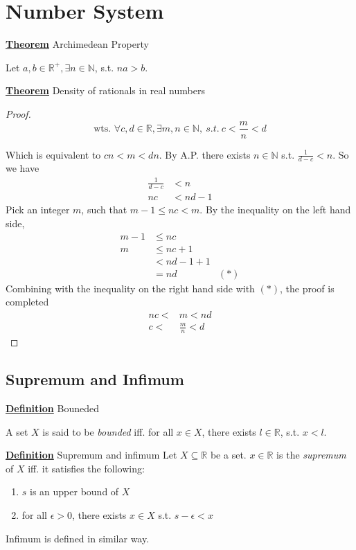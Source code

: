 \documentclass[a4paper, 12pt]{article}
\begin{document}
\section{Number System}
\textbf{\underline{Theorem}} Archimedean Property

Let $a,b\in \mathbb{R^+}, \exists n\in\mathbb{N}$, s.t. $na>b$.

\vspace{5mm}

\textbf{\underline{Theorem}} Density of rationals in real numbers
\begin{proof}

    $$\textrm{wts. } \forall c,d\in\mathbb{R},\exists m,n\in\mathbb{N}, ~s.t.~ 
    c<\frac{m}{n}<d$$

    Which is equivalent to $cn < m < dn$.
    By A.P. there exists $n\in\mathbb{N}$ s.t. $\frac{1}{d-c} < n$. So we have
    $$\begin{aligned}
        \frac{1}{d-c} &< n\\
        nc &< nd - 1
    \end{aligned}$$
    Pick an integer $m$, such that $m-1 \leq nc < m$.
    By the inequality on the left hand side, 
    $$\begin{aligned}
        m - 1 &\leq nc\\
        m & \leq nc + 1\\
          &< nd - 1 + 1\\
          &= nd &(*)
    \end{aligned}$$
    Combining with the inequality on the right hand side with $(*)$, the proof
    is completed
    $$\begin{aligned}
        nc < &m < nd\\
        c < &\frac{m}{n} < d
    \end{aligned}$$
\end{proof}
\subsection{Supremum and Infimum}
\textbf{\underline{Definition}} Bouneded

A set $X$ is said to be \textit{bounded} iff. for all $x\in X$, there exists
$l \in \mathbb{R}$, s.t. $x < l$.

\vspace{5mm}
\textbf{\underline{Definition}} Supremum and infimum
Let $X\subseteq \mathbb{R}$ be a set. $x\in\mathbb{R}$ is the \textit{supremum}
of $X$ iff. it satisfies the following:
\begin{enumerate}
    \item $s$ is an upper bound of $X$
    \item for all $\epsilon > 0$, there exists $x\in X$ s.t. $s - \epsilon < x$
\end{enumerate}
Infimum is defined in similar way.
\end{document}
